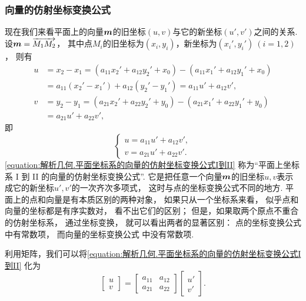 \subsubsection{向量的仿射坐标变换公式}
现在我们来看平面上的向量\(\boldsymbol{m}\)的旧坐标\((u,v)\)与它的新坐标\((u',v')\)之间的关系.
设\(\boldsymbol{m}=\overrightarrow{M_1 M_2}\)，
其中点\(M_i\)的旧坐标为\((x_i,y_i)\)，新坐标为\((x_i',y_i')\ (i=1,2)\)，
则有\begin{align*}
	u &= x_2 - x_1
	= (a_{11} x_2' + a_{12} y_2' + x_0)
	- (a_{11} x_1' + a_{12} y_1' + x_0) \\
	&= a_{11} (x_2' - x_1')
	+ a_{12} (y_2' - y_1')
	= a_{11} u' + a_{12} v', \\
	v &= y_2 - y_1
	= (a_{21} x_2' + a_{22} y_2' + y_0)
	- (a_{21} x_1' + a_{22} y_1' + y_0) \\
	&= a_{21} u' + a_{22} v',
\end{align*}
即\begin{equation}\label{equation:解析几何.平面坐标系的向量的仿射坐标变换公式I到II}
	\left\{ \begin{array}{l}
		u = a_{11} u' + a_{12} v', \\
		v = a_{21} u' + a_{22} v'.
	\end{array} \right.
\end{equation}
\cref{equation:解析几何.平面坐标系的向量的仿射坐标变换公式I到II}
称为“平面上坐标系 I 到 II 的向量的仿射坐标变换公式”.
它是把任意一个向量\(\boldsymbol{m}\)的旧坐标\(u,v\)表示成它的新坐标\(u',v'\)的一次齐次多项式，
这时与点的坐标变换公式不同的地方.
平面上的点和向量是有本质区别的两种对象，
如果只从一个坐标系来看，
似乎点和向量的坐标都是有序实数对，
看不出它们的区别；
但是，如果取两个原点不重合的仿射坐标系，
通过坐标变换，
就可以看出两者的显著区别：
点的坐标变换公式  中有常数项，
而向量的坐标变换公式  中没有常数项.

利用矩阵，我们可以将\cref{equation:解析几何.平面坐标系的向量的仿射坐标变换公式I到II}
化为\begin{equation}\label{equation:解析几何.平面坐标系的向量的仿射坐标变换公式I到II.矩阵形式1}
	\begin{bmatrix}
		u \\ v
	\end{bmatrix}
	= \begin{bmatrix}
		a_{11} & a_{12} \\
		a_{21} & a_{22}
	\end{bmatrix} \begin{bmatrix}
		u' \\ v'
	\end{bmatrix}.
\end{equation}

